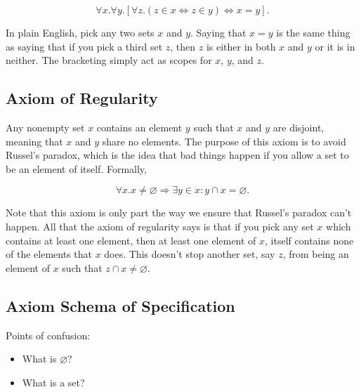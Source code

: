 \documentclass{article}
\begin{document}
$$
\forall x. \forall y. [\forall z. (z \in x \Leftrightarrow z \in y)
\Leftrightarrow x = y].
$$

In plain English, pick any two sets $x$ and $y$. Saying that $x = y$ is the
same thing as saying that if you pick a third set $z$, then $z$ is either in
both $x$ and $y$ or it is in neither. The bracketing simply act as scopes for
$x$, $y$, and $z$.

\subsection{Axiom of Regularity}

Any nonempty set $x$ contains an element $y$ such that $x$ and $y$ are
disjoint, meaning that $x$ and $y$ share no elements. The purpose of this axiom
is to avoid Russel's paradox, which is the idea that bad things happen if you
allow a set to be an element of itself. Formally,

$$
\forall x. x \neq \varnothing \Rightarrow \exists y \in x : y \cap x =
\varnothing.
$$

Note that this axiom is only part the way we ensure that Russel's paradox can't
happen. All that the axiom of regularity says is that if you pick any set $x$
which contains at least one element, then at least one element of $x$, itself
contains none of the elements that $x$ does. This doesn't stop another set, say
$z$, from being an element of $x$ such that $z \cap x \neq \varnothing$.

\subsection{Axiom Schema of Specification}

Points of confusion:

\begin{itemize}
  \item What is $\varnothing$?
  \item What is a set?
\end{itemize}
\end{document}
